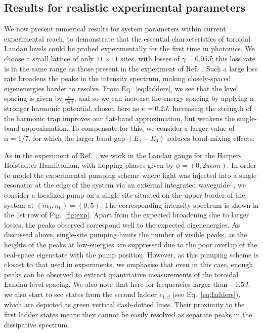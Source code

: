 \subsection{Results for realistic experimental parameters}
\label{sec:experiment}

We now present numerical results for system parameters within current experimental reach, to demonstrate that the essential characteristics of toroidal Landau levels could be probed experimentally for the first time in photonics. We choose a small
lattice of only $11 \times 11$ sites, with losses of $\gamma = 0.05 J$; this loss rate is in the same range as those present in the experiment of
Ref.~\cite{hafezi2013imaging}. Such a large loss rate broadens the
peaks in the intensity spectrum, making closely-spaced eigenenergies harder to resolve. From
Eq.~\eqref{eq:ladders}, we see that the level spacing is given by
$\frac{\kappa}{2\pi\alpha}$, and so we can increase the energy spacing by applying a stronger harmonic potential, chosen here as $\kappa = 0.2 J$. Increasing the strength of the harmonic trap improves our flat-band approximation, but weakens the single-band approximation. To compensate for this, we consider a larger value of $\alpha = 1/7$, for which the larger band-gap $(E_1 - E_0)$ reduces band-mixing effects. 

As in the experiment of Ref.~\cite{hafezi2013imaging}, we work in the Landau gauge for the Harper-Hofstadter Hamiltonian, with hopping phases given by $\phi = (0, 2\pi\alpha m)$. In order to model the experimental pumping scheme where light was injected into a single resonator at the edge of the system via an external integrated waveguide~\cite{hafezi2013imaging}, we consider a localized pump on a single site situated on the upper border of the system at $(m_0,n_0)= (0,5)$. 
The corresponding intensity spectrum is shown in the 1st row of Fig.~\ref{fig:exp}. Apart from the expected
broadening due to larger losses, the peaks observed correspond well to the expected eigenenergies. 
As discussed above, single-site pumping limits the number of visible peaks, as the heights of the peaks at low-energies are suppressed due to the poor overlap of the real-space eigenstate with the pump position. However, as this pumping scheme is closest to that used in experiments, we emphasise that even in this case, enough peaks can be observed to extract quantitative measurements of the toroidal Landau level spacing. We also note that here for frequencies larger
than $-1.5 J$, we also start to see states from the second ladder
$\epsilon_{1,\beta}$ (see Eq.~\eqref{eq:ladders}), which are depicted as green
vertical dash-dotted lines. Their proximity to the first ladder states
means they cannot be easily resolved as separate peaks in the dissipative
spectrum.


